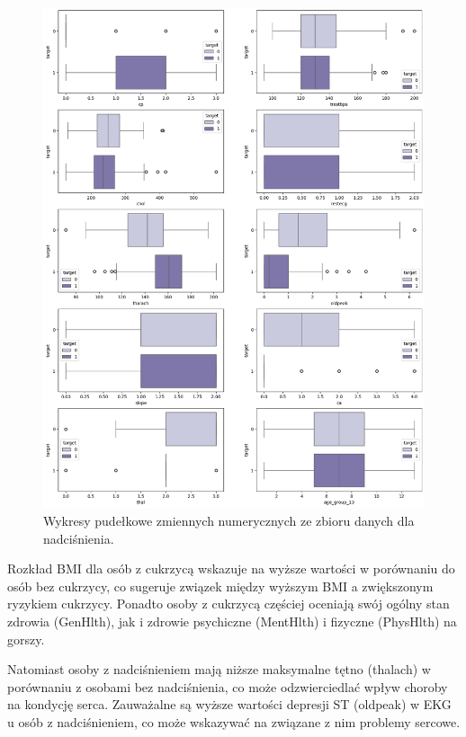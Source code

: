 \documentclass[onecolumn,12pt]{article}
\begin{document}
\begin{figure}[H]
    \centering
    \includegraphics[width=1\linewidth]{raport/graphs/hypertension_boxplot.png}
    \captionsetup{justification=centering}
    \caption{Wykresy pudełkowe zmiennych numerycznych ze zbioru danych dla nadciśnienia.}
    \label{fig:enter-label}
\end{figure}

\newpage
\noindent
Rozkład BMI dla osób z cukrzycą wskazuje na wyższe wartości w porównaniu do osób bez cukrzycy, co sugeruje związek między wyższym BMI a zwiększonym ryzykiem cukrzycy. Ponadto osoby z cukrzycą częściej oceniają swój ogólny stan zdrowia (GenHlth), jak i zdrowie psychiczne (MentHlth) i fizyczne (PhysHlth) na gorszy.

\vspace{8pt}
\noindent
Natomiast osoby z nadciśnieniem mają niższe maksymalne tętno (thalach) w porównaniu z osobami bez nadciśnienia, co może odzwierciedlać wpływ choroby na kondycję serca. Zauważalne są wyższe wartości depresji ST (oldpeak) w EKG u osób z nadciśnieniem, co może wskazywać na związane z nim problemy sercowe.
\end{document}
